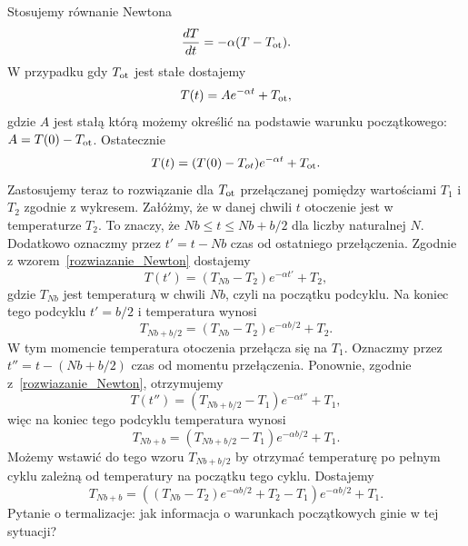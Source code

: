\documentclass[11pt,a4paper]{article}
\begin{document}
Stosujemy równanie Newtona
\begin{equation}
	\frac{dT}{dt} = - \alpha (T - T_{\rm ot}).
\end{equation}
W przypadku gdy $T_{\rm ot}$ jest stałe dostajemy
\begin{equation}
	T(t) = A e^{-\alpha t} + T_{\rm ot},
\end{equation}
gdzie $A$ jest stałą którą możemy określić na podstawie warunku początkowego: $A = T(0) - T_{\rm ot}$. Ostatecznie
\begin{equation}
	T(t) = (T(0) - T_{ot})e^{-\alpha t} + T_{\rm ot}. \label{rozwiazanie_Newton}
\end{equation}
Zastosujemy teraz to rozwiązanie dla $T_{\rm ot}$ przełączanej pomiędzy wartościami $T_1$ i $T_2$ zgodnie z wykresem. Załóżmy, że w danej chwili $t$ otoczenie jest w temperaturze $T_2$. To znaczy, że $N b \leq t \leq Nb + b/2$ dla liczby naturalnej $N$. Dodatkowo oznaczmy przez $t'= t - Nb$ czas od ostatniego przełączenia. Zgodnie z wzorem~\eqref{rozwiazanie_Newton} dostajemy
\begin{equation}
	T(t') = (T_{Nb} - T_2) e^{-\alpha t'} + T_2,
\end{equation}
gdzie $T_{Nb}$ jest temperaturą w chwili $Nb$, czyli na początku podcyklu. Na koniec tego podcyklu $t' = b/2$ i temperatura wynosi
\begin{equation}
	T_{Nb + b/2} = (T_{Nb} - T_2) e^{-\alpha b/2} + T_2.
\end{equation}
W tym momencie temperatura otoczenia przełącza się na $T_1$. Oznaczmy przez $t'' = t - (Nb + b/2)$ czas od momentu przełączenia. Ponownie, zgodnie z~\eqref{rozwiazanie_Newton}, otrzymujemy
\begin{equation}
	T(t'') = (T_{Nb +b/2} -T_1) e^{-\alpha t''} + T_1,
\end{equation}
więc na koniec tego podcyklu temperatura wynosi
\begin{equation}
	T_{Nb +b} = (T_{Nb +b/2} -T_1) e^{-\alpha b/2} + T_1.
\end{equation}
Możemy wstawić do tego wzoru $T_{Nb +b/2}$ by otrzymać temperaturę po pełnym cyklu zależną od temperatury na początku tego cyklu. Dostajemy
\begin{equation}
	T_{Nb +b} = \left( (T_{Nb} - T_2)e^{-\alpha b/2} + T_2 - T_1\right) e^{-\alpha b/2} + T_1. \label{jeden_cykl}
\end{equation}
Pytanie o termalizacje: jak informacja o warunkach początkowych ginie w tej sytuacji?
\end{document}
